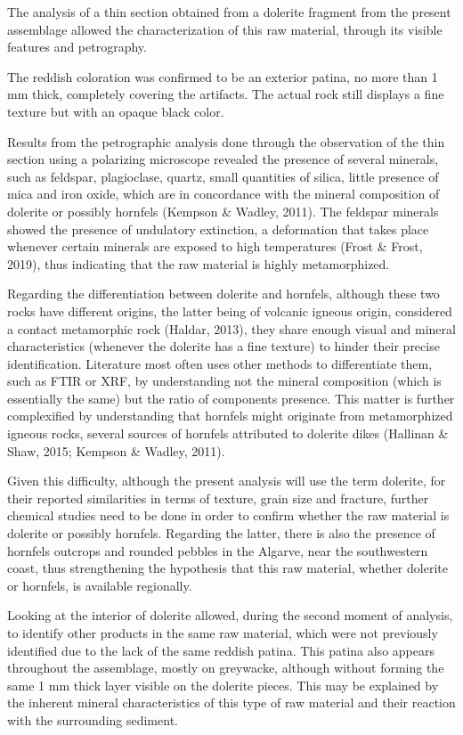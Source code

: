 \documentclass[12pt,twoside]{reedthesis}
\begin{document}
The analysis of a thin section obtained from a dolerite fragment from the present assemblage allowed the characterization of this raw material, through its visible features and petrography.

The reddish coloration was confirmed to be an exterior patina, no more than 1 mm thick, completely covering the artifacts. The actual rock still displays a fine texture but with an opaque black color.

Results from the petrographic analysis done through the observation of the thin section using a polarizing microscope revealed the presence of several minerals, such as feldspar, plagioclase, quartz, small quantities of silica, little presence of mica and iron oxide, which are in concordance with the mineral composition of dolerite or possibly hornfels (Kempson \& Wadley, 2011). The feldspar minerals showed the presence of undulatory extinction, a deformation that takes place whenever certain minerals are exposed to high temperatures (Frost \& Frost, 2019), thus indicating that the raw material is highly metamorphized.

Regarding the differentiation between dolerite and hornfels, although these two rocks have different origins, the latter being of volcanic igneous origin, considered a contact metamorphic rock (Haldar, 2013), they share enough visual and mineral characteristics (whenever the dolerite has a fine texture) to hinder their precise identification. Literature most often uses other methods to differentiate them, such as FTIR or XRF, by understanding not the mineral composition (which is essentially the same) but the ratio of components presence. This matter is further complexified by understanding that hornfels might originate from metamorphized igneous rocks, several sources of hornfels attributed to dolerite dikes (Hallinan \& Shaw, 2015; Kempson \& Wadley, 2011).

Given this difficulty, although the present analysis will use the term dolerite, for their reported similarities in terms of texture, grain size and fracture, further chemical studies need to be done in order to confirm whether the raw material is dolerite or possibly hornfels. Regarding the latter, there is also the presence of hornfels outcrops and rounded pebbles in the Algarve, near the southwestern coast, thus strengthening the hypothesis that this raw material, whether dolerite or hornfels, is available regionally.

Looking at the interior of dolerite allowed, during the second moment of analysis, to identify other products in the same raw material, which were not previously identified due to the lack of the same reddish patina. This patina also appears throughout the assemblage, mostly on greywacke, although without forming the same 1 mm thick layer visible on the dolerite pieces. This may be explained by the inherent mineral characteristics of this type of raw material and their reaction with the surrounding sediment.
\end{document}
